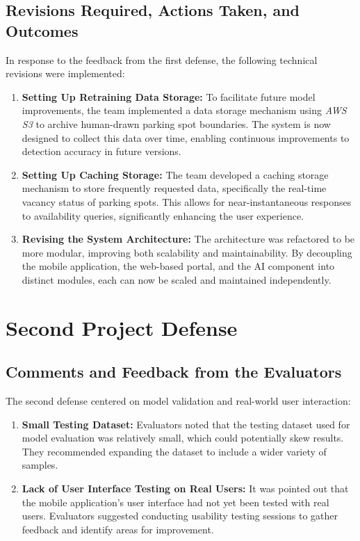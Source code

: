 \subsection{Revisions Required, Actions Taken, and Outcomes}
\label{section:first-project-defense-revisions-required-actions-taken-and-outcomes}

In response to the feedback from the first defense, the following technical revisions were implemented:

\begin{enumerate}
    \item \textbf{Setting Up Retraining Data Storage:} To facilitate future model improvements, the team implemented a data storage mechanism using \textit{AWS S3} to archive human-drawn parking spot boundaries. The system is now designed to collect this data over time, enabling continuous improvements to detection accuracy in future versions.
    \item \textbf{Setting Up Caching Storage:} The team developed a caching storage mechanism to store frequently requested data, specifically the real-time vacancy status of parking spots. This allows for near-instantaneous responses to availability queries, significantly enhancing the user experience.
    \item \textbf{Revising the System Architecture:} The architecture was refactored to be more modular, improving both scalability and maintainability. By decoupling the mobile application, the web-based portal, and the AI component into distinct modules, each can now be scaled and maintained independently.
\end{enumerate}

\section{Second Project Defense}
\label{section:second-project-defense}

\subsection{Comments and Feedback from the Evaluators}
\label{section:second-project-defense-comments-and-feedback-from-the-evaluators}

The second defense centered on model validation and real-world user interaction:

\begin{enumerate}
    \item \textbf{Small Testing Dataset:} Evaluators noted that the testing dataset used for model evaluation was relatively small, which could potentially skew results. They recommended expanding the dataset to include a wider variety of samples.
    \item \textbf{Lack of User Interface Testing on Real Users:} It was pointed out that the mobile application's user interface had not yet been tested with real users. Evaluators suggested conducting usability testing sessions to gather feedback and identify areas for improvement.
\end{enumerate}

